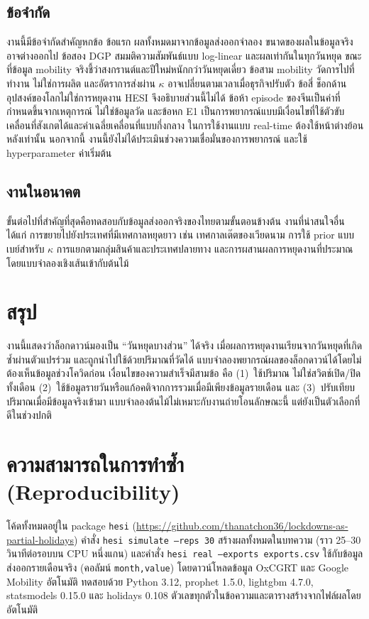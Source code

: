 \documentclass{article}
\theoremstyle{definition}
\begin{document}
\subsection{ข้อจำกัด}
งานนี้มีข้อจำกัดสำคัญหกข้อ ข้อแรก ผลทั้งหมดมาจากข้อมูลส่งออกจำลอง ขนาดของผลในข้อมูลจริงอาจต่างออกไป ข้อสอง DGP สมมติความสัมพันธ์แบบ log-linear และผลเท่ากันในทุกวันหยุด ขณะที่ข้อมูล mobility จริงชี้ว่าสงกรานต์และปีใหม่หนักกว่าวันหยุดเดี่ยว ข้อสาม mobility วัดการไปที่ทำงาน ไม่ใช่การผลิต และอัตราการส่งผ่าน $\kappa$ อาจเปลี่ยนตามเวลาเมื่อธุรกิจปรับตัว ข้อสี่ ช็อกด้านอุปสงค์ของโลกไม่ใช่การหยุดงาน HESI จึงอธิบายส่วนนี้ไม่ได้ ข้อห้า episode ของจีนเป็นค่าที่กำหนดขึ้นจากเหตุการณ์ ไม่ใช่ข้อมูลวัด และข้อหก E1 เป็นการพยากรณ์แบบมีเงื่อนไขที่ใช้ตัวขับเคลื่อนที่สังเกตได้และค่าเฉลี่ยเคลื่อนที่แบบกึ่งกลาง ในการใช้งานแบบ real-time ต้องใช้หน้าต่างย้อนหลังเท่านั้น นอกจากนี้ งานนี้ยังไม่ได้ประเมินช่วงความเชื่อมั่นของการพยากรณ์ และใช้ hyperparameter ค่าเริ่มต้น

\subsection{งานในอนาคต}
ขั้นต่อไปที่สำคัญที่สุดคือทดสอบกับข้อมูลส่งออกจริงของไทยตามขั้นตอนข้างต้น งานที่น่าสนใจอื่น ได้แก่ การขยายไปยังประเทศที่มีเทศกาลหยุดยาว เช่น เทศกาลเต๊ตของเวียดนาม การใช้ prior แบบเบย์สำหรับ $\kappa$ การแยกตามกลุ่มสินค้าและประเทศปลายทาง และการผสานผลการหยุดงานที่ประมาณโดยแบบจำลองเชิงเส้นเข้ากับต้นไม้

\section{สรุป}
งานนี้แสดงว่าล็อกดาวน์มองเป็น “วันหยุดบางส่วน” ได้จริง เมื่อผลการหยุดงานเรียนจากวันหยุดที่เกิดซ้ำผ่านตัวแปรร่วม และถูกนำไปใช้ด้วยปริมาณที่วัดได้ แบบจำลองพยากรณ์ผลของล็อกดาวน์ได้โดยไม่ต้องเห็นข้อมูลช่วงโควิดก่อน เงื่อนไขของความสำเร็จมีสามข้อ คือ (1)~ใช้ปริมาณ ไม่ใช่สวิตช์เปิด/ปิดทั้งเดือน (2)~ใช้ข้อมูลรายวันหรือแก้อคติจากการรวมเมื่อมีเพียงข้อมูลรายเดือน และ (3)~ปรับเทียบปริมาณเมื่อมีข้อมูลจริงเข้ามา แบบจำลองต้นไม้ไม่เหมาะกับงานถ่ายโอนลักษณะนี้ แต่ยังเป็นตัวเลือกที่ดีในช่วงปกติ

\section*{ความสามารถในการทำซ้ำ (Reproducibility)}
โค้ดทั้งหมดอยู่ใน package \texttt{hesi} (\url{https://github.com/thanatchon36/lockdowns-as-partial-holidays}) คำสั่ง \texttt{hesi simulate --reps 30} สร้างผลทั้งหมดในบทความ (ราว 25--30 วินาทีต่อรอบบน CPU หนึ่งแกน) และคำสั่ง \texttt{hesi real --exports exports.csv} ใช้กับข้อมูลส่งออกรายเดือนจริง (คอลัมน์ \texttt{month,value}) โดยดาวน์โหลดข้อมูล OxCGRT และ Google Mobility อัตโนมัติ ทดสอบด้วย Python 3.12, prophet 1.5.0, lightgbm 4.7.0, statsmodels 0.15.0 และ holidays 0.108 ตัวเลขทุกตัวในข้อความและตารางสร้างจากไฟล์ผลโดยอัตโนมัติ
\end{document}
